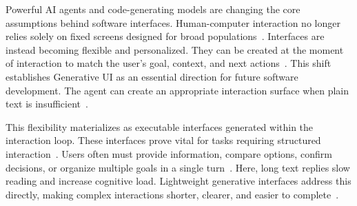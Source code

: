 \documentclass{llmxive}
\begin{document}



Powerful AI agents and code-generating models are changing the core assumptions behind software interfaces. Human-computer interaction no longer relies solely on fixed screens designed for broad populations~\citep{findlater2004comparison}. Interfaces are instead becoming flexible and personalized. They can be created at the moment of interaction to match the user's goal, context, and next actions~\citep{gajos2010automatically}. This shift establishes Generative UI as an essential direction for future software development. The agent can create an appropriate interaction surface when plain text is insufficient~\citep{todi2021adapting}.

This flexibility materializes as executable interfaces generated within the interaction loop. These interfaces prove vital for tasks requiring structured interaction~\citep{cohen2019foundations}. Users often must provide information, compare options, confirm decisions, or organize multiple goals in a single turn~\citep{norman1986cognitive, qian2025userbench, budzianowski2018multiwoz, kong2026infopo}. Here, long text replies slow reading and increase cognitive load. Lightweight generative interfaces address this directly, making complex interactions shorter, clearer, and easier to complete~\citep{avula2022effects}.
\end{document}
